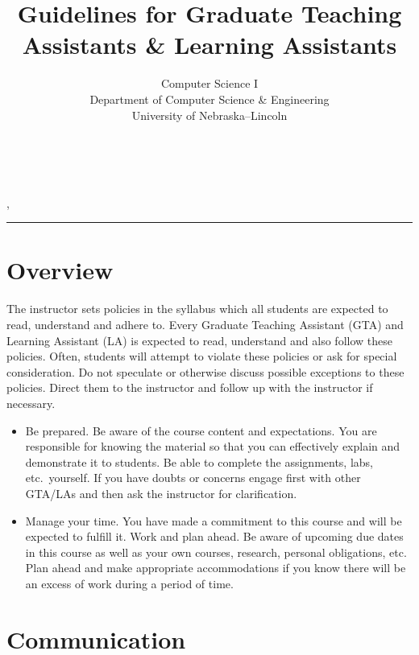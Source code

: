 \documentclass[12pt]{scrartcl}
\title{Guidelines for Graduate Teaching Assistants \& Learning Assistants}\let\Title\@title
\subtitle{Computer Science I\\
{\small
\vskip1cm
Department of Computer Science \& Engineering \\
University of Nebraska--Lincoln}
\vskip-1cm}
\date{~}
\begin{document}
\maketitle

\newwatermark[allpages=true,scale=5,textmark=Draft]{},

\hrule

\section*{Overview}

The instructor sets policies in the syllabus which all students 
are expected to read, understand and adhere to. Every Graduate 
Teaching Assistant (GTA) and Learning Assistant (LA) is expected 
to read, understand and also follow these policies.  Often, 
students will attempt to violate these policies or ask for special 
consideration.  Do not speculate or otherwise discuss possible 
exceptions to these policies.  Direct them to the instructor 
and follow up with the instructor if necessary.

\begin{itemize}
  \item Be prepared.  Be aware of the course content and expectations.
  You are responsible for knowing the material so that you can effectively
  explain and demonstrate it to students.  Be able to complete the assignments, 
  labs, etc.\ yourself.  If you have doubts or concerns engage first with
  other GTA/LAs and then ask the instructor for clarification.
  \item Manage your time.  You have made a commitment to this course and
  will be expected to fulfill it.  Work and plan ahead.  Be aware of 
  upcoming due dates in this course as well as your own courses, research, 
  personal obligations, etc.  Plan ahead and make appropriate accommodations 
  if you know there will be an excess of work during a period of time.
\end{itemize}

\section*{Communication}
\end{document}
